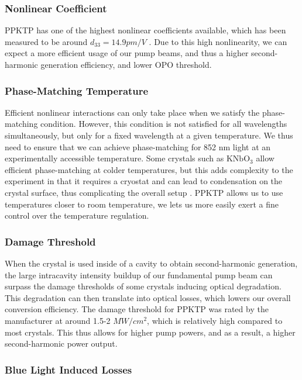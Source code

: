 \subsubsection{Nonlinear Coefficient}
\label{nonlinear_coefficient} 

PPKTP has one of the highest nonlinear coefficients available, which has been measured to be around $d_{33} = 14.9 pm/V$ \cite{arie1997}.  Due to this high nonlinearity, we can expect a more efficient usage of our pump beams, and thus a higher second-harmonic generation efficiency, and lower OPO threshold.


\subsubsection{Phase-Matching Temperature}
\label{phase_matching_temperature} 

Efficient nonlinear interactions can only take place when we satisfy the phase-matching condition.  However, this condition is not satisfied for all wavelengths simultaneously, but only for a fixed wavelength at a given temperature.  We thus need to ensure that we can achieve phase-matching for 852 nm light at an experimentally accessible temperature.  Some crystals such as $\mathrm{KNbO}_3$ allow efficient phase-matching at colder temperatures, but this adds complexity to the experiment in that it requires a cryostat and can lead to condensation on the crystal surface, thus complicating the overall setup \cite{Biaggio92}.  PPKTP allows us to use temperatures closer to room temperature, we lets us more easily exert a fine control over the temperature regulation.

\subsubsection{Damage Threshold}
\label{damage_threshold} 

When the crystal is used inside of a cavity to obtain second-harmonic generation, the large intracavity intensity buildup of our fundamental pump beam can surpass the damage thresholds of some crystals inducing optical degradation.  This degradation can then translate into optical losses, which lowers our overall conversion efficiency. The damage threshold for PPKTP was rated by the manufacturer at around 1.5-2 $MW/cm^2$, which is relatively high compared to most crystals.  This thus allows for higher pump powers, and as a result, a higher second-harmonic power output.


\subsubsection{Blue Light Induced Losses}
\label{blue_light_induced_losses} 

